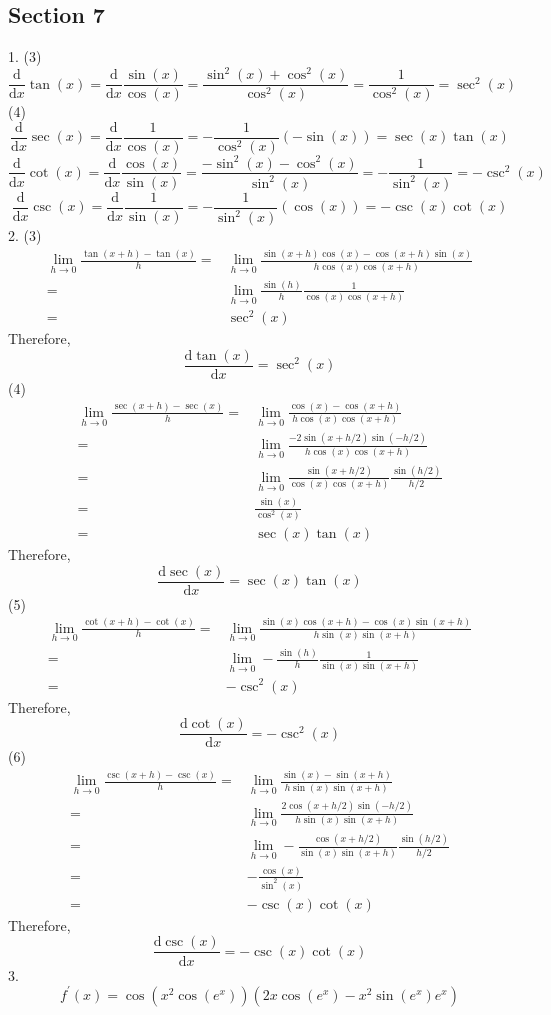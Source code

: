 \subsection{Section 7}
1. (3)
$$\frac{\mathrm d}{\mathrm dx}\tan(x)=\frac{\mathrm d}{\mathrm dx}\frac{\sin(x)}{\cos(x)}=\frac{\sin^2(x)+\cos^2(x)}{\cos^2(x)}=\frac{1}{\cos^2(x)}=\sec^2(x)$$
(4)
$$\frac{\mathrm d}{\mathrm dx}\sec(x)=\frac{\mathrm d}{\mathrm dx}\frac{1}{\cos(x)}=-\frac{1}{\cos^2(x)}(-\sin(x))=\sec(x)\tan(x)$$
$$\frac{\mathrm d}{\mathrm dx}\cot(x)=\frac{\mathrm d}{\mathrm dx}\frac{\cos(x)}{\sin(x)}=\frac{-\sin^2(x)-\cos^2(x)}{\sin^2(x)}=-\frac{1}{\sin^2(x)}=-\csc^2(x)$$
$$\frac{\mathrm d}{\mathrm dx}\csc(x)=\frac{\mathrm d}{\mathrm dx}\frac{1}{\sin(x)}=-\frac{1}{\sin^2(x)}(\cos(x))=-\csc(x)\cot(x)$$
2. (3)
\begin{align*}
    \lim_{h\to0}\frac{\tan(x+h)-\tan(x)}{h}
    =&\lim_{h\to0}\frac{\sin(x+h)\cos(x)-\cos(x+h)\sin(x)}{h\cos(x)\cos(x+h)}\\
    =&\lim_{h\to0}\frac{\sin(h)}{h}\frac{1}{\cos(x)\cos(x+h)}\\
    =&\sec^2(x)
\end{align*}
Therefore,
$$\frac{\mathrm d\tan(x)}{\mathrm dx}=\sec^2(x)$$
(4)
\begin{align*}
    \lim_{h\to0}\frac{\sec(x+h)-\sec(x)}{h}
    =&\lim_{h\to0}\frac{\cos(x)-\cos(x+h)}{h\cos(x)\cos(x+h)}\\
    =&\lim_{h\to0}\frac{-2\sin(x+h/2)\sin(-h/2)}{h\cos(x)\cos(x+h)}\\
    =&\lim_{h\to0}\frac{\sin(x+h/2)}{\cos(x)\cos(x+h)}\frac{\sin(h/2)}{h/2}\\
    =&\frac{\sin(x)}{\cos^2(x)}\\
    =&\sec(x)\tan(x)
\end{align*}
Therefore,
$$\frac{\mathrm d\sec(x)}{\mathrm dx}=\sec(x)\tan(x)$$
(5)
\begin{align*}
    \lim_{h\to0}\frac{\cot(x+h)-\cot(x)}{h}
    =&\lim_{h\to0}\frac{\sin(x)\cos(x+h)-\cos(x)\sin(x+h)}{h\sin(x)\sin(x+h)}\\
    =&\lim_{h\to0}-\frac{\sin(h)}{h}\frac{1}{\sin(x)\sin(x+h)}\\
    =&-\csc^2(x)
\end{align*}
Therefore,
$$\frac{\mathrm d\cot(x)}{\mathrm dx}=-\csc^2(x)$$
(6)
\begin{align*}
    \lim_{h\to0}\frac{\csc(x+h)-\csc(x)}{h}
    =&\lim_{h\to0}\frac{\sin(x)-\sin(x+h)}{h\sin(x)\sin(x+h)}\\
    =&\lim_{h\to0}\frac{2\cos(x+h/2)\sin(-h/2)}{h\sin(x)\sin(x+h)}\\
    =&\lim_{h\to0}-\frac{\cos(x+h/2)}{\sin(x)\sin(x+h)}\frac{\sin(h/2)}{h/2}\\
    =&-\frac{\cos(x)}{\sin^2(x)}\\
    =&-\csc(x)\cot(x)
\end{align*}
Therefore,
$$\frac{\mathrm d\csc(x)}{\mathrm dx}=-\csc(x)\cot(x)$$
3.
$$f^\prime(x)=\cos(x^2\cos(e^x))(2x\cos(e^x)-x^2\sin(e^x)e^x)$$
